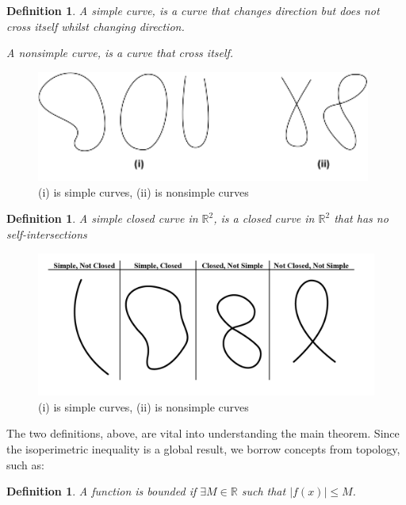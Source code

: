 \documentclass[a4paper]{book}
\newtheorem{definition}[theorem]{Definition}%
\numberwithin{theorem}{section}%
\begin{document}
\begin{definition}
    A simple curve, is a curve that changes direction but does not cross itself whilst changing direction. 

    A nonsimple curve, is a curve that cross itself.
\end{definition}
\begin{figure}[hbt!]
    \begin{center}   
        \includegraphics[width=110mm]{SimpleCurves}
        \caption{(i) is simple curves, (ii) is nonsimple curves}
    \end{center}
\end{figure}\leavevmode

\begin{definition}
    A simple closed curve in $\mathbb{R}^2$, is a closed curve in $\mathbb{R}^2$ that has no self-intersections
\end{definition}
\begin{figure}[hbt!]
    \begin{center}   
        \includegraphics[width=120mm]{SimpleClosedCurveExamples}
        \caption{(i) is simple curves, (ii) is nonsimple curves}
    \end{center}
\end{figure}\leavevmode

The two definitions, above, are vital into understanding the main theorem. Since the isoperimetric inequality is a global result, we borrow concepts from topology, such as:

\begin{definition}
    A function is bounded if $\exists M \in \mathbb{R}$ such that $\left| f(x) \right| \leq M$.
\end{definition}
\end{document}
